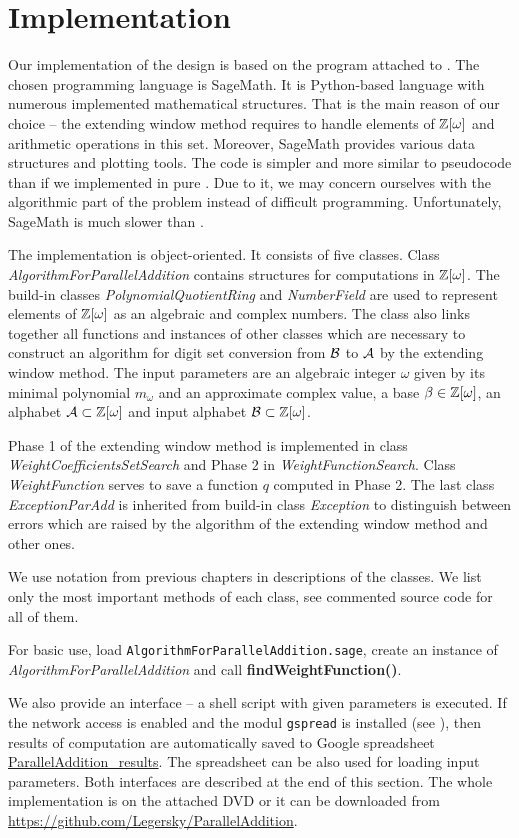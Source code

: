 \section{Implementation}
\label{sec:implementation}
Our implementation of the design is based on the program attached to \cite{vu}. The chosen programming language is SageMath. It is Python-based language with numerous implemented mathematical structures. That is the main reason of our choice -- the extending window method requires to handle elements of $\mathbb{Z}[\omega]$ and arithmetic operations in this set. Moreover, SageMath provides various data structures and plotting tools.  The code is simpler and more similar to pseudocode than if we implemented in pure \Cpp. Due to it, we may concern ourselves with the algorithmic part of the problem instead of difficult programming. Unfortunately, SageMath is much slower than \Cpp.


The implementation is object-oriented. It consists of five classes. Class \emph{AlgorithmForParallelAddition} contains structures for computations in $\mathbb{Z}[\omega]$. The build-in classes \emph{PolynomialQuotientRing} and \emph{NumberField} are used to represent elements of $\mathbb{Z}[\omega]$ as an algebraic and complex numbers. The class also links together all functions and instances of other classes which are necessary to construct an algorithm for digit set conversion from $\mathcal{B}$ to $\mathcal{A}$ by the extending window method. The input parameters are an algebraic integer $\omega$ given by its minimal polynomial $m_\omega$ and an approximate complex value, a base $\beta\in\mathbb{Z}[\omega]$, an alphabet $\mathcal{A}\subset\mathbb{Z}[\omega]$ and input alphabet $\mathcal{B}\subset\mathbb{Z}[\omega]$. 

Phase 1 of the extending window method is implemented in class \emph{WeightCoefficientsSetSearch} and Phase 2 in \emph{WeightFunctionSearch}. Class \emph{WeightFunction} serves to save a function $q$ computed in Phase 2. The last class \emph{ExceptionParAdd} is inherited from build-in class \emph{Exception} to distinguish between errors which are raised by the algorithm  of the extending window method and other ones.

We use notation from previous chapters in descriptions of the classes. We list only the most important methods of each class, see commented source code for all of them.  

For basic use, load \verb+AlgorithmForParallelAddition.sage+, create an instance of \emph{AlgorithmForParallelAddition} and call \textbf{findWeightFunction()}.

We also provide an interface -- a shell script with given parameters is executed. If the network access is enabled and the modul \verb+gspread+ is installed (see \cite{gspread}), then results of computation are automatically saved to Google spreadsheet \href{https://docs.google.com/spreadsheets/d/1TnhrHdefHfHa0WSeVs4q6XVj3epjPlPlnoekE0E1xeM/edit?usp=sharing}{ParallelAddition\_results}. The spreadsheet can be also used for loading input parameters. Both interfaces are described at the end of this section. The whole implementation is on the attached DVD or it can be downloaded from  \url{https://github.com/Legersky/ParallelAddition}.



